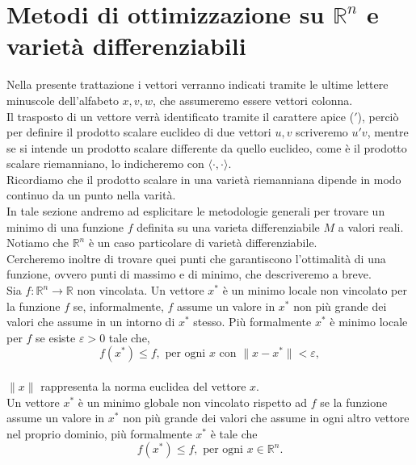 \documentclass[a4paper, 12pt]{article}
\begin{document}
\section{Metodi di ottimizzazione su $\mathbb{R}^n$ e varietà differenziabili}
Nella presente trattazione i vettori verranno indicati tramite le ultime lettere minuscole dell'alfabeto $x, v, w$, che assumeremo essere vettori colonna.\\
Il trasposto di un vettore verrà identificato tramite il carattere apice ($'$), perciò per definire il prodotto scalare euclideo di due vettori $u, v$ scriveremo $u'v$, mentre se si intende  un prodotto scalare differente da quello euclideo, come è il prodotto scalare riemanniano, lo indicheremo con $\langle \cdot,\cdot \rangle$.\\
Ricordiamo che il prodotto scalare in una varietà riemanniana dipende in modo continuo da un punto nella varità.\\
In tale sezione andremo ad esplicitare le metodologie generali per trovare un minimo di una funzione $f$ definita su una varieta differenziabile $M$ a valori reali.\\
Notiamo che $\mathbb{R}^n$ è un caso particolare di varietà differenziabile.\\
Cercheremo inoltre di trovare quei punti che garantiscono l'ottimalità di una funzione, ovvero punti di massimo e di minimo, che descriveremo a breve.\\
Sia $f: \mathbb{R} ^n \to \mathbb{R}$ non vincolata.
Un vettore $x^\ast$ è un minimo locale non vincolato per la funzione $f$ se, informalmente, $f$ assume un valore in $x^\ast$ non più grande dei valori che assume in un intorno di $x^\ast$ stesso. Più formalmente $x^\ast$ è minimo locale per $f$ se esiste $\varepsilon > 0$ tale che,\\
\[f(x^\ast) \leq f, \mbox{ per ogni } x \mbox{ con } \parallel x - x^\ast \parallel < \varepsilon,\]\\
$\| x \|$ rappresenta la norma euclidea del vettore $x$.\\
Un vettore $x^\ast$ è un minimo globale non vincolato rispetto ad $f$ se la funzione assume un valore in $x^\ast$ non più grande dei valori che assume in ogni altro vettore nel proprio dominio, più formalmente $x^\ast$ è tale che\\
\[f(x^\ast) \leq f, \mbox{ per ogni } x \in \mathbb{R}^n.\]\\
\end{document}
